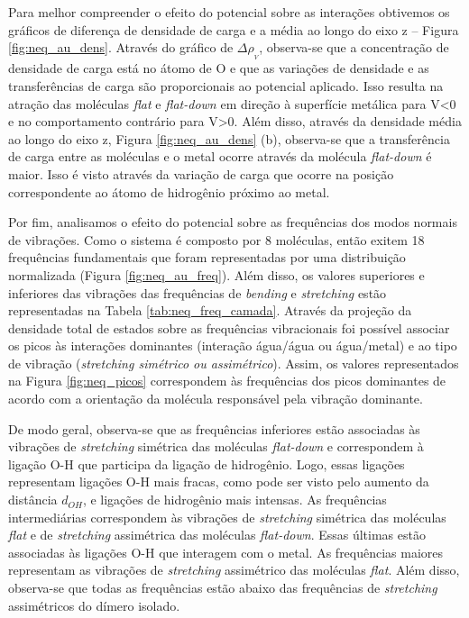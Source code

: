 Para melhor compreender o efeito do potencial sobre as interações obtivemos os gráficos de diferença de densidade de carga e a média ao longo do eixo z -- Figura \ref{fig:neq_au_dens}. Através do gráfico de $ \Delta\rho_{_ {V}} $, observa-se que a concentração de densidade de carga está no átomo de O e que as variações de densidade e as transferências de carga são proporcionais ao potencial aplicado. Isso resulta na atração das moléculas \textit{flat} e \textit{flat-down} em direção à superfície metálica para V<0 e no comportamento contrário para V>0. Além disso, através da densidade média ao longo do eixo z, Figura \ref{fig:neq_au_dens} (b), observa-se que a transferência de carga entre as moléculas e o metal ocorre através da molécula \textit{flat-down} é maior. Isso é visto através da variação de carga que ocorre na posição correspondente ao átomo de hidrogênio próximo ao metal. %

Por fim, analisamos o efeito do potencial sobre as frequências dos modos normais de vibrações. Como o sistema é composto por 8 moléculas, então exitem 18 frequências fundamentais que foram representadas por uma distribuição normalizada (Figura \ref{fig:neq_au_freq}). Além disso, os valores superiores e inferiores das vibrações das frequências de \textit{bending} e \textit{stretching} estão representadas na Tabela \ref{tab:neq_freq_camada}. Através da projeção da densidade total de estados sobre as frequências vibracionais foi possível associar os picos às interações dominantes (interação água/água ou água/metal) e ao tipo de vibração (\textit{stretching simétrico ou assimétrico}). Assim, os valores representados na Figura \ref{fig:neq_picos} correspondem às frequências dos picos dominantes de acordo com a orientação da molécula responsável pela vibração dominante.

De modo geral, observa-se que as frequências inferiores estão associadas às vibrações de \textit{stretching} simétrica das moléculas \textit{flat-down} e correspondem à ligação O-H que participa da ligação de hidrogênio. Logo, essas ligações representam ligações O-H mais fracas, como pode ser visto pelo aumento da distância $ d_{OH} $, e ligações de hidrogênio mais intensas. As frequências intermediárias correspondem às vibrações de \textit{stretching} simétrica das moléculas \textit{flat} e de \textit{stretching} assimétrica das moléculas \textit{flat-down}. Essas últimas estão associadas às ligações O-H que interagem com o metal. As frequências maiores representam as vibrações de \textit{stretching} assimétrico das moléculas \textit{flat}. Além disso, observa-se que todas as frequências estão abaixo das frequências de \textit{stretching} assimétricos do dímero isolado.

